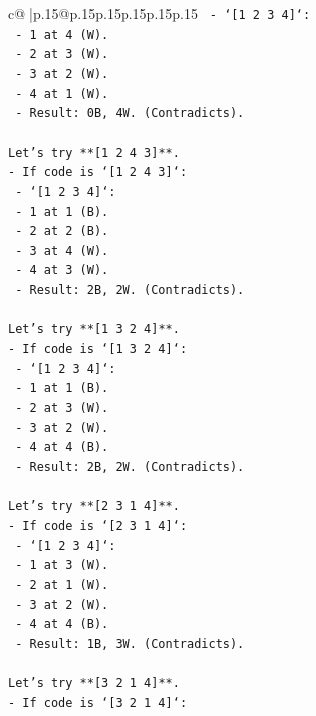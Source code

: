 \documentclass{article}
\begin{document}
{\begin{supertabular}{c@{$\;$}|p{.15\linewidth}@{}p{.15\linewidth}p{.15\linewidth}p{.15\linewidth}p{.15\linewidth}p{.15\linewidth}}
{{{\texttt{  {-} `{[}1 2 3 4{]}`:} \\
\texttt{    {-} 1 at 4 (W).} \\
\texttt{    {-} 2 at 3 (W).} \\
\texttt{    {-} 3 at 2 (W).} \\
\texttt{    {-} 4 at 1 (W).} \\
\texttt{    {-} Result: 0B, 4W. (Contradicts).} \\
\\ 
\texttt{Let's try **{[}1 2 4 3{]}**.} \\
\texttt{{-} If code is `{[}1 2 4 3{]}`:} \\
\texttt{  {-} `{[}1 2 3 4{]}`:} \\
\texttt{    {-} 1 at 1 (B).} \\
\texttt{    {-} 2 at 2 (B).} \\
\texttt{    {-} 3 at 4 (W).} \\
\texttt{    {-} 4 at 3 (W).} \\
\texttt{    {-} Result: 2B, 2W. (Contradicts).} \\
\\ 
\texttt{Let's try **{[}1 3 2 4{]}**.} \\
\texttt{{-} If code is `{[}1 3 2 4{]}`:} \\
\texttt{  {-} `{[}1 2 3 4{]}`:} \\
\texttt{    {-} 1 at 1 (B).} \\
\texttt{    {-} 2 at 3 (W).} \\
\texttt{    {-} 3 at 2 (W).} \\
\texttt{    {-} 4 at 4 (B).} \\
\texttt{    {-} Result: 2B, 2W. (Contradicts).} \\
\\ 
\texttt{Let's try **{[}2 3 1 4{]}**.} \\
\texttt{{-} If code is `{[}2 3 1 4{]}`:} \\
\texttt{  {-} `{[}1 2 3 4{]}`:} \\
\texttt{    {-} 1 at 3 (W).} \\
\texttt{    {-} 2 at 1 (W).} \\
\texttt{    {-} 3 at 2 (W).} \\
\texttt{    {-} 4 at 4 (B).} \\
\texttt{    {-} Result: 1B, 3W. (Contradicts).} \\
\\ 
\texttt{Let's try **{[}3 2 1 4{]}**.} \\
\texttt{{-} If code is `{[}3 2 1 4{]}`:} \\
}}}
\end{supertabular}}
\end{document}
